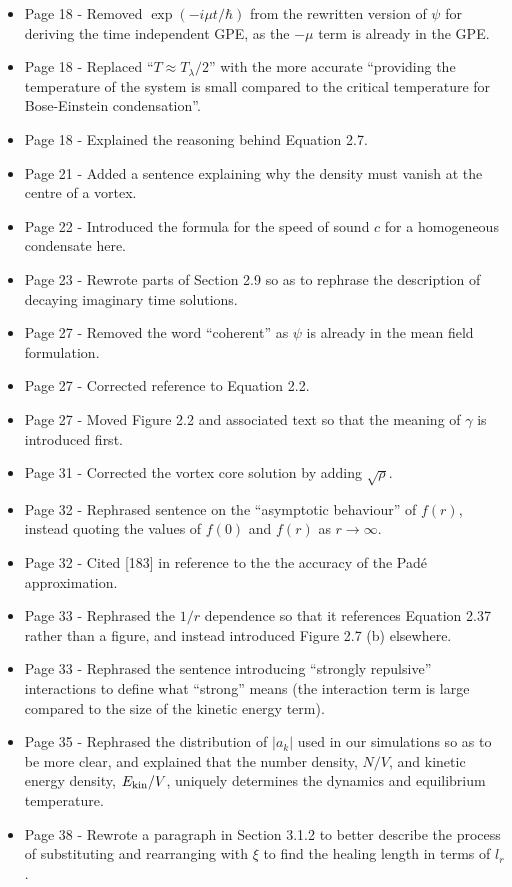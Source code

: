 \documentclass{article}
\begin{document}
\begin{itemize}
\item Page 18 - Removed $\exp (-i\mu t / \hbar)$ from the rewritten version of $\psi$ for deriving the time independent GPE, as the $-\mu$ term is already in the GPE.
\item Page 18 - Replaced ``$T\approx T_\lambda/2$'' with the more accurate ``providing the temperature of the system is small compared to the critical temperature for Bose-Einstein condensation''.
\item Page 18 - Explained the reasoning behind Equation 2.7.
\item Page 21 - Added a sentence explaining why the density must vanish at the centre of a vortex.
\item Page 22 - Introduced the formula for the speed of sound $c$ for a homogeneous condensate here.
\item Page 23 - Rewrote parts of Section 2.9 so as to rephrase the description of decaying imaginary time solutions.
\item Page 27 - Removed the word ``coherent'' as $\psi$ is already in the mean field formulation.
\item Page 27 - Corrected reference to Equation 2.2.
\item Page 27 - Moved Figure 2.2 and associated text so that the meaning of $\gamma$ is introduced first.
\item Page 31 - Corrected the vortex core solution by adding $\sqrt{\rho}$.
\item Page 32 - Rephrased sentence on the ``asymptotic behaviour'' of $f(r)$, instead quoting the values of $f(0)$ and $f(r)$ as $r\rightarrow\infty$.
\item Page 32 - Cited [183] in reference to the the accuracy of the Pad\'e approximation.
\item Page 33 - Rephrased the $1/r$ dependence so that it references Equation 2.37 rather than a figure, and instead introduced Figure 2.7 (b) elsewhere.
\item Page 33 - Rephrased the sentence introducing ``strongly repulsive'' interactions to define what ``strong'' means (the interaction term is large compared to the size of the kinetic energy term).
\item Page 35 - Rephrased the distribution of $|a_k|$ used in our simulations so as to be more clear, and explained that the number density, $N/V$, and kinetic energy density, $E_{\rm kin}/V$, uniquely determines the dynamics and equilibrium temperature.
\item Page 38 - Rewrote a paragraph in Section 3.1.2 to better describe the process of substituting and rearranging with $\xi$ to find the healing length in terms of $l_r$.

\end{itemize}
\end{document}
